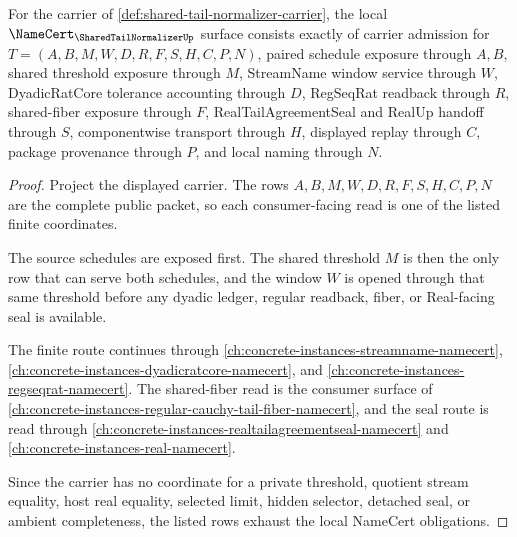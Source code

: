\begin{theorem}
\label{thm:shared-tail-normalizer-namecert-obligations}
For the carrier of \autoref{def:shared-tail-normalizer-carrier}, the local $\NameCert_{\SharedTailNormalizerUp}$ surface consists exactly of carrier admission for $T=(A,B,M,W,D,R,F,S,H,C,P,N)$, paired schedule exposure through $A,B$, shared threshold exposure through $M$, StreamName window service through $W$, DyadicRatCore tolerance accounting through $D$, RegSeqRat readback through $R$, shared-fiber exposure through $F$, RealTailAgreementSeal and RealUp handoff through $S$, componentwise transport through $H$, displayed replay through $C$, package provenance through $P$, and local naming through $N$.
\end{theorem}
\begin{proof}
Project the displayed carrier. The rows $A,B,M,W,D,R,F,S,H,C,P,N$ are the complete public packet, so each consumer-facing read is one of the listed finite coordinates.

The source schedules are exposed first. The shared threshold $M$ is then the only row that can serve both schedules, and the window $W$ is opened through that same threshold before any dyadic ledger, regular readback, fiber, or Real-facing seal is available.

The finite route continues through \autoref{ch:concrete-instances-streamname-namecert}, \autoref{ch:concrete-instances-dyadicratcore-namecert}, and \autoref{ch:concrete-instances-regseqrat-namecert}. The shared-fiber read is the consumer surface of \autoref{ch:concrete-instances-regular-cauchy-tail-fiber-namecert}, and the seal route is read through \autoref{ch:concrete-instances-realtailagreementseal-namecert} and \autoref{ch:concrete-instances-real-namecert}.

Since the carrier has no coordinate for a private threshold, quotient stream equality, host real equality, selected limit, hidden selector, detached seal, or ambient completeness, the listed rows exhaust the local NameCert obligations.
\end{proof}

